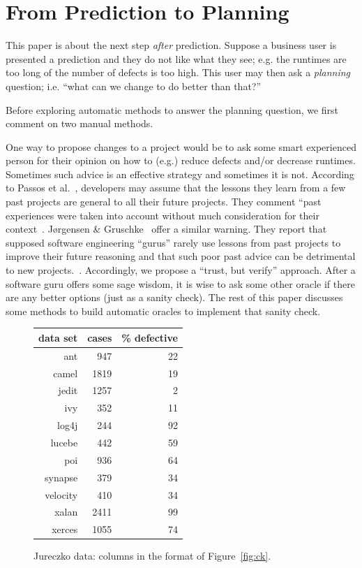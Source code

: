 \documentclass{sig-alternate}
\newcommand{\fig}[1]{Figure~\ref{fig:#1}}
\begin{document}


\section{From Prediction to Planning}
 

This paper is about the next step {\em after} prediction. Suppose
a business user is presented a prediction and they do not like what they see; e.g. the runtimes are too long of the number of defects is too high. This user may
then ask a {\em planning}  question; i.e. ``what can we change to do better than that?'' 

Before exploring automatic methods to answer the planning question, we first comment
on two manual methods.

One way to propose changes to a project would be to   ask some smart experienced
person for their opinion on how to (e.g.) reduce defects and/or decrease runtimes. Sometimes
such advice 
is an effective strategy and sometimes it is not.
According to Passos et al.~\cite{passos11},  developers
may  assume that the lessons they learn from a few past
projects are general to 
all their future projects. They comment ``past experiences were taken into account without 
much consideration for their context~\cite{passos11}.  
 J{\o}rgensen \& Gruschke~\cite{jorgensen09} offer  a similar warning. They report that 
  supposed software engineering    ``gurus'' rarely use lessons
  from past projects to improve their future reasoning and that such poor
  past advice can be detrimental to new projects.~\cite{jorgensen09}.
  Accordingly, we   propose a ``trust, but verify'' approach.
  After a software guru offers some sage wisdom,  it is wise to ask some other oracle 
  if there are any better options
  (just as a sanity check).
  The rest of this paper discusses some methods to build automatic oracles 
  to implement that   sanity check.
  
  
 \begin{figure}[!t]
 \small
 \begin{center}
 \begin{tabular}{r|rr}
 data set & cases & \% defective\\\hline
  ant &947& 22\\
  camel& 1819& 19\\
 jedit& 1257& 2\\
 ivy &352& 11\\
 log4j& 244 &92\\
 lucebe &442 &59\\
 poi& 936 &64\\
 synapse &379 &34\\
 velocity& 410& 34\\
 xalan& 2411& 99\\
 xerces &1055& 74
 \end{tabular}
 \end{center}
 \caption{ Jureczko data: columns in the format of \fig{ck}.}\label{fig:jd}
 \end{figure}
 
\end{document}
